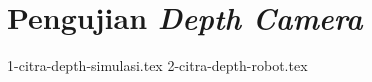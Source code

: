 \section{Pengujian \emph{Depth Camera}}
\label{sec:pengujiandepthcamera}


{1-citra-depth-simulasi.tex}
{2-citra-depth-robot.tex}
